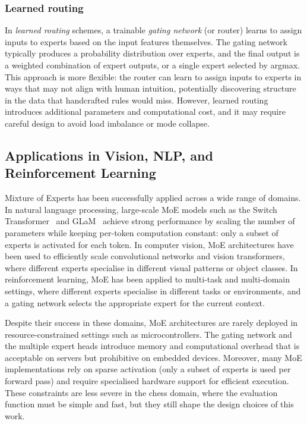\subsubsection{Learned routing}\label{sec:learned-routing}

In \emph{learned routing} schemes, a trainable \emph{gating network} (or router) learns to assign inputs to experts based on the input features themselves. The gating network typically produces a probability distribution over experts, and the final output is a weighted combination of expert outputs, or a single expert selected by argmax. This approach is more flexible: the router can learn to assign inputs to experts in ways that may not align with human intuition, potentially discovering structure in the data that handcrafted rules would miss. However, learned routing introduces additional parameters and computational cost, and it may require careful design to avoid load imbalance or mode collapse.

\subsection{Applications in Vision, NLP, and Reinforcement Learning}\label{sec:moe-apps}

Mixture of Experts has been successfully applied across a wide range of domains. In natural language processing, large-scale MoE models such as the Switch Transformer~\cite{fedus2022switch} and GLaM~\cite{du2022glam} achieve strong performance by scaling the number of parameters while keeping per-token computation constant: only a subset of experts is activated for each token. In computer vision, MoE architectures have been used to efficiently scale convolutional networks and vision transformers, where different experts specialise in different visual patterns or object classes. In reinforcement learning, MoE has been applied to multi-task and multi-domain settings, where different experts specialise in different tasks or environments, and a gating network selects the appropriate expert for the current context.

Despite their success in these domains, MoE architectures are rarely deployed in resource-constrained settings such as microcontrollers. The gating network and the multiple expert heads introduce memory and computational overhead that is acceptable on servers but prohibitive on embedded devices. Moreover, many MoE implementations rely on sparse activation (only a subset of experts is used per forward pass) and require specialised hardware support for efficient execution. These constraints are less severe in the chess domain, where the evaluation function must be simple and fast, but they still shape the design choices of this work.

